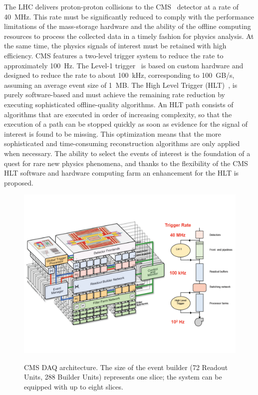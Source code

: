 \documentclass{JINST}
\begin{document}
The LHC delivers proton-proton collisions to the CMS~\cite{CMS:1994hea} detector at a rate of 40~MHz. This rate
must be significantly reduced to comply with the performance limitations of the mass-storage hardware and the ability
of the offline computing resources to process the collected data in a timely fashion for physics analysis. At the same
time, the physics signals of interest must be retained with high efficiency. CMS features a two-level trigger system to reduce
the rate to approximately 100~Hz. The Level-1 trigger~\cite{Dasu:2000ge} is based on custom hardware and designed to reduce the rate
to about 100~kHz, corresponding to 100~GB/s, assuming an average event size of 1~MB. The High Level Trigger (HLT)~\cite{Sphicas:2002gg},\cite{Sakulin:2007rj}
is purely software-based and must achieve the remaining rate reduction by executing sophisticated offline-quality algorithms.
An HLT path consists of algorithms that are executed in order of increasing complexity, so that
the execution of a path can be stopped quickly as soon as evidence for the signal of interest is found to be missing.
This optimization means that the more sophisticated and time-consuming reconstruction algorithms are only applied when necessary.
The ability to select the events of interest is the foundation of a
quest for rare new physics phenomena, and thanks to the flexibility of the CMS HLT software and hardware computing farm an enhancement for the HLT is proposed.

\begin{figure}[!Hhtb]
  \begin{center}
    \includegraphics[width=1.0\textwidth]{figs/CMSTrigger.pdf} \label{fig:hltarc}
      \caption{CMS DAQ architecture. The size of the event builder (72 Readout Units, 288 Builder Units) represents one slice; the system can be equipped with up to eight slices.}
  \end{center}
\end{figure}
\end{document}
